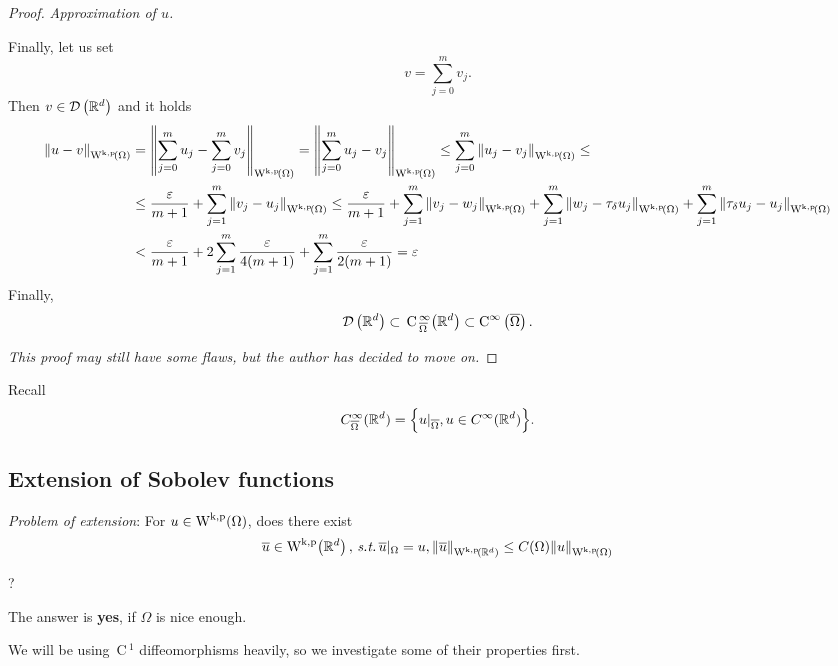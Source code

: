 \documentclass{article}
\begin{document}
\begin{proof}
\textit{Approximation of $u$.}

Finally, let us set
\[
	v = \sum_{j=0}^m v_j.
\]
Then $v \in \mathcal{D}\!\,\left({\mathbb R}^{d} \right)$ and it holds
\begin{align*}
	\norm{u-v}_{\WkpSet{\Omega}} &= \norm{\sum_{j=0}^m u_j- \sum_{j=0}^m v_j}_{\WkpSet{\Omega}} = \norm{\sum_{j=0}^m u_j - v_j}_{\WkpSet{\Omega}} \leq \sum_{j=0}^m \norm{u_j - v_j}_{\WkpSet{\Omega}} \leq \\
	& \leq \frac{\varepsilon}{m+1} + \sum_{j=1}^m \norm{v_j-u_j}_{\WkpSet{\Omega}} \leq \frac{\varepsilon}{m+1} + \sum_{j=1}^m \norm{v_j - w_j}_{\WkpSet{\Omega}} + \sum_{j=1}^m \norm{w_j - \tau_{\delta}u_j}_{\WkpSet{\Omega}} + \sum_{j=1}^m \norm{\tau_{\delta}u_j - u_j}_{\WkpSet{\Omega}}\\
	&< \frac{\varepsilon}{m+1} +  2\sum_{j=1}^m \frac{\varepsilon}{4\qty(m+1)} + \sum_{j=1}^m \frac{\varepsilon}{2\qty(m+1)} = \varepsilon
\end{align*}
Finally,
\[
	\mathcal{D}\!\,\left({\mathbb R}^{d} \right) \subset \, \text{C} \,^{\infty}_{\overline{\Omega}}\qty({\mathbb R}^{d}) \subset \text{C}^{\infty}\!\,\left(\overline{\Omega} \right).
\]

\textit{This proof may still have some flaws, but the author has decided to move on.}
\end{proof}	

\begin{remark}
	Recall
	\[
		C^\infty_{\overline{\Omega}}({\mathbb R}^d) = \Big\{u|_{\overline{\Omega}}, u \in C^{\infty}({\mathbb R}^d) \Big\}.
	\]
\end{remark}



\subsection{Extension of Sobolev functions}
\label{sec:extension}

\textit{Problem of extension}: For $u \in \WkpSet{\Omega}$, does there exist
\[
	\overline{u} \in \WkpSet{\R^d}, \, \text{\textit{s.t.}} \,\overline{u}|_{\Omega}=u, \norm{\overline{u}}_{\WkpSet{\R^d}} \leq C(\Omega) \norm{u}_{\WkpSet{\Omega}}
\]

?

The answer is \textbf{yes}, if $\Omega$ is nice enough. 

We will be using $\, \text{C} \,^1$ diffeomorphisms heavily, so we investigate some of their properties first.
\end{document}
